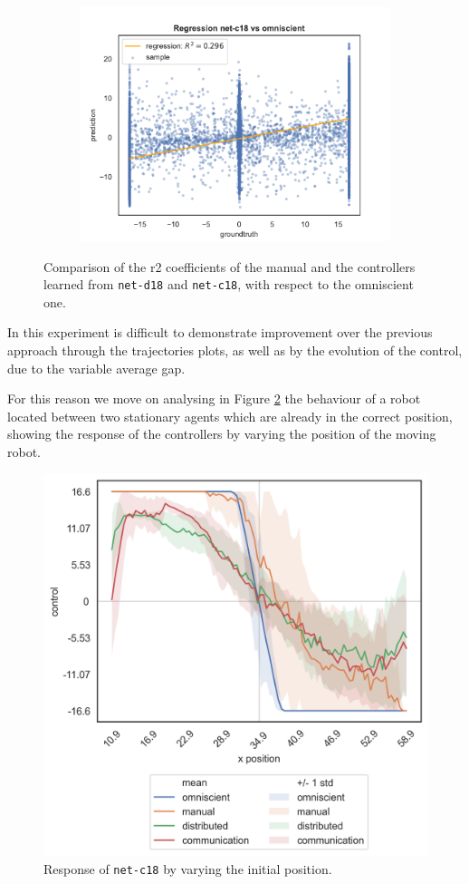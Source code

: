 \begin{figure}[!htb]
\begin{center}
\begin{subfigure}[h]{0.49\textwidth}
			\includegraphics[width=\textwidth]{contents/images/net-c18/regression-net-c18-vs-omniscient}%
		\end{subfigure}
	\end{center}
	\caption[Evaluation of the \gls{r2} coefficients of 
	\texttt{net-c18}.]{Comparison 
		of the \gls{r2} coefficients of the manual and the controllers learned from 
		\texttt{net-d18} and \texttt{net-c18}, with respect to the omniscient 
		one.}
	\label{fig:net-c18r2}
\end{figure}

\bigskip
In this experiment is difficult to demonstrate improvement over the previous 
approach through the trajectories plots, as well as by the evolution of the control, 
due to the variable average gap. 

For this reason we move on analysing in Figure 
\ref{fig:net-c18responseposition} 
the behaviour of a robot located between two stationary agents which are already 
in the correct position, showing the response of the controllers by varying the 
position of the moving robot. 
\begin{figure}[!htb]
	\centering
	\includegraphics[width=.45\textwidth]{contents/images/net-c18/response-varying_init_position-communication}%
	\caption{Response of \texttt{net-c18} by varying the initial position.}
	\label{fig:net-c18responseposition}
\end{figure}

